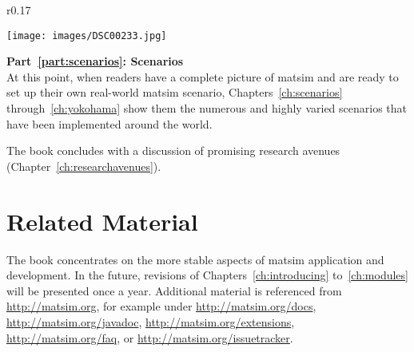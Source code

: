 \begin{wrapfigure}[7]{r}{0.17\textwidth}
\vspace{-10pt}
  \begin{center}
    \texttt{[image: images/DSC00233.jpg]}
  \end{center}
\end{wrapfigure}
\textbf{Part~\ref{part:scenarios}: Scenarios}\\
At this point, when readers have a complete picture of \gls{matsim} and are ready to set up their own real-world \gls{matsim} \gls{scenario}, Chapters~\ref{ch:scenarios} through~\ref{ch:yokohama} show them the numerous and highly varied scenarios that have been implemented around the world.

\vskip 1cm
The book concludes with a discussion of promising research avenues (Chapter~\ref{ch:researchavenues}).

\section*{Related Material}

The book concentrates on the more stable aspects of \gls{matsim} application and development.  In the future, revisions of Chapters~\ref{ch:introducing} to~\ref{ch:modules} will be presented once a year.  Additional material is referenced from \url{http://matsim.org}, for example under \url{http://matsim.org/docs}, \url{http://matsim.org/javadoc}, \url{http://matsim.org/extensions}, \url{http://matsim.org/faq}, or \url{http://matsim.org/issuetracker}.




